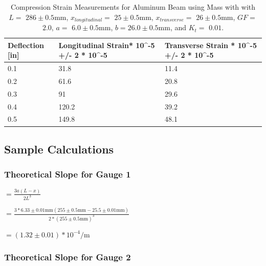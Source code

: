 \documentclass[]{article}
\newcommand{\gaugeOneTheoretical}{\ensuremath{(1.32 \pm 0.01) * 10^{-4}
\si{\per\meter}}}
\newcommand{\xOne}{\ensuremath{25.5 \pm 0.01 \si{\milli\meter}}}
\newcommand{\xTop}{\ensuremath{25 \pm 0.5 \si{\milli\meter}}}
\newcommand{\xBottom}{\ensuremath{26 \pm 0.5 \si{\milli\meter}}}
\newcommand{\GF}{\ensuremath{2.0}}
\newcommand{\Kt}{\ensuremath{0.01}}
\newcommand{\LOne}{\ensuremath{255 \pm 0.5 \si{\milli\meter}}}
\newcommand{\LTwo}{\ensuremath{286 \pm 0.5 \si{\milli\meter}}}
\newcommand{\aOne}{\ensuremath{6.33 \pm 0.01 \si{\milli\meter}}}
\newcommand{\aTwo}{\ensuremath{6.0 \pm 0.5 \si{\milli\meter}}}
\newcommand{\bTwo}{\ensuremath{26.0 \pm 0.5 \si{\milli\meter}}}
\begin{document}
\begin{table}[H]
    \caption{Compression Strain Measurements for Aluminum Beam using Mass with with
    $L=$ \LTwo, $x_{longitudinal}=$ \xTop, $x_{transverse} =$ \xBottom, $GF= $
    \GF, $a= $ \aTwo, $b= $\bTwo, and $K_t=$ \Kt.
    }\label{tab:strain4}
    \begin{tabular}{@{}lp{4.5cm}p{4.5cm}@{}}
        \toprule
        Deflection [in] & Longitudinal Strain*  10\textasciicircum -5 +/- 2 * 10\textasciicircum -5 & Transverse Strain *  10\textasciicircum -5 +/- 2 * 10\textasciicircum -5 \\ \midrule
        0.1                 & 31.8                                                                      & 11.4                                                                      \\
        0.2                 & 61.6                                                                      & 20.8                                                                      \\
        0.3                 & 91                                                                        & 29.6                                                                      \\
        0.4                 & 120.2                                                                     & 39.2                                                                      \\
        0.5                 & 149.8                                                                     & 48.1                                                                      \\ \bottomrule
    \end{tabular}
\end{table}

\subsection{Sample Calculations}
\subsubsection{Theoretical Slope for Gauge 1}
$= \frac{3a(L-x)}{2L^3} $

$= \frac{3 * \aOne (\LOne - \xOne)}{2 * {(\LOne)}^3}$

$= \gaugeOneTheoretical$

\subsubsection{Theoretical Slope for Gauge 2}
\end{document}
